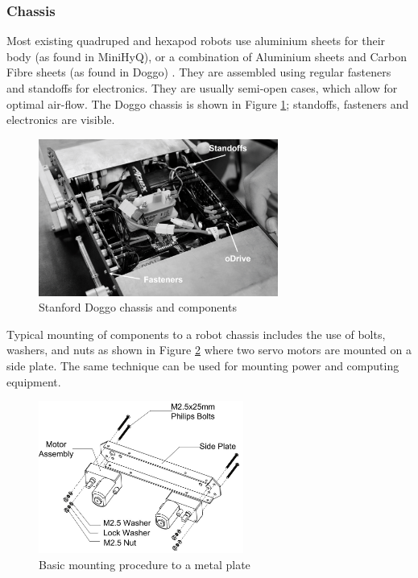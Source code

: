 
\subsubsection{Chassis}

Most existing quadruped and hexapod robots use aluminium sheets for their body (as found in MiniHyQ), or a combination of Aluminium sheets and Carbon Fibre sheets (as found in Doggo) \cite{khan_minihyq_2015} \cite{kau_stanford_2019}.
They are assembled using regular fasteners and standoffs for electronics. They are usually semi-open cases, which allow for optimal air-flow.
The Doggo chassis is shown in Figure \ref{fig:doggo_chassis}; standoffs, fasteners and electronics are visible.

\begin{figure}[h]
    \centering
    \includegraphics[width=0.7\textwidth]{Sections/LiteratureReview/img/doggo/subsys_doggo_chassis.png}
    \caption{Stanford Doggo chassis and components \cite{kau_stanford_2019}}
    \label{fig:doggo_chassis}
\end{figure}

Typical mounting of components to a robot chassis includes the use of bolts, washers, and nuts as shown in Figure \ref{fig:baisc_chassis_mounting} where two servo motors are mounted on a side plate. The same technique can be used for mounting power and computing equipment.

\begin{figure}[h]
    \centering
    \includegraphics[width=0.6\textwidth]{Sections/LiteratureReview/img/Chasis/mountingBasic.jpg}
    \caption{Basic mounting procedure to a metal plate \cite{oreilly_building_nodate}}
    \label{fig:baisc_chassis_mounting}
\end{figure}


